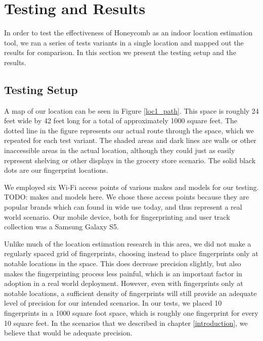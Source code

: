 \chapter{Testing and Results}
\label{results}
%

In order to test the effectiveness of Honeycomb as an indoor location estimation tool, we ran a series of tests variants in a single location and mapped out the results for comparison. In this section we present the testing setup and the results. 


\section{Testing Setup}
%

 A map of our location can be seen in Figure \ref{loc1_path}. This space is roughly 24 feet wide by 42 feet long for a total of approximately 1000 square feet. The dotted line in the figure represents our actual route through the space, which we repeated for each test variant. The shaded areas and dark lines are walls or other inaccessible areas in the actual location, although they could just as easily represent shelving or other displays in the grocery store scenario. The solid black dots are our fingerprint locations.
 
 We employed six Wi-Fi access points of various makes and models for our testing. TODO: makes and models here. We chose these access points because they are popular brands which can found in wide use today, and thus represent a real world scenario. Our mobile device, both for fingerprinting and user track collection was a Samsung Galaxy S5. 
 
 Unlike much of the location estimation research in this area, we did not make a regularly spaced grid of fingerprints, choosing instead to place fingerprints only at notable locations in the space. This does decrease precision slightly, but also makes the fingerprinting process less painful, which is an important factor in adoption in a real world deployment. However, even with fingerprints only at notable locations, a sufficient density of fingerprints will still provide an adequate level of precision for our intended scenarios. In our tests, we placed 10 fingerprints in a 1000 square foot space, which is roughly one fingerprint for every 10 square feet. In the scenarios that we described in chapter \ref{introduction}, we believe that would be adequate precision. 


